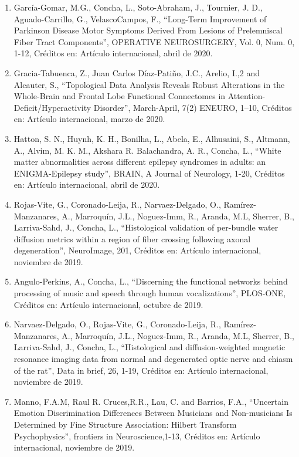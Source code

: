 \begin{enumerate}
\item García-Gomar, M.G., Concha, L., Soto-Abraham, J., Tournier, J. D., Aguado-Carrillo, G., VelascoCampos, F., “Long-Term 
Improvement of Parkinson Disease Motor Symptoms Derived From Lesions of Prelemniscal Fiber Tract Components”, OPERATIVE 
NEUROSURGERY, Vol. 0, Num. 0, 1-12, Créditos en: Artículo internacional, abril de 2020.

\item Gracia-Tabuenca, Z., Juan Carlos Díaz-Patiño, J.C., Arelio, I.,2 and Alcauter, S., “Topological Data Analysis Reveals 
Robust Alterations in the Whole-Brain and Frontal Lobe Functional Connectomes in Attention-Deficit/Hyperactivity Disorder”, 
March-April, 7(2) ENEURO, 1–10, Créditos en: Artículo internacional, marzo de 2020.

\item Hatton, S. N., Huynh, K. H., Bonilha, L., Abela, E., Alhusaini, S., Altmann, A., Alvim, M. K. M., Akshara R. 
Balachandra, A. R., Concha, L., “White matter abnormalities across different epilepsy syndromes in adults: an 
ENIGMA-Epilepsy study”, BRAIN, A Journal of Neurology, 1-20, Créditos en: Artículo internacional, abril de 2020.

\item Rojas-Vite, G., Coronado-Leija, R., Narvaez-Delgado, O., Ramírez-Manzanares, A., Marroquín, J.L., Noguez-Imm, R., 
Aranda, M.L, Sherrer, B., Larriva-Sahd, J., Concha, L., “Histological validation of per-bundle water diffusion metrics 
within a region of fiber crossing following axonal degeneration”, NeuroImage, 201, Créditos en: Artículo internacional, 
noviembre de 2019.

\item Angulo-Perkins, A., Concha, L., “Discerning the functional networks behind processing of music and speech through 
human 
vocalizations”, PLOS-ONE, Créditos en: Artículo internacional, octubre de 2019.

\item Narvaez-Delgado, O., Rojas-Vite, G., Coronado-Leija, R., Ramírez-Manzanares, A., Marroquín, J.L., Noguez-Imm, R., 
Aranda, M.L, Sherrer, B., Larriva-Sahd, J., Concha, L., “Histological and diffusion-weighted magnetic resonance imaging 
data from normal and degenerated optic nerve and chiasm of the rat”, Data in brief, 26, 1-19, Créditos en: Artículo 
internacional, noviembre de 2019.

\item Manno, F.A.M, Raul R. Cruces,R.R., Lau, C. and Barrios, F.A., “Uncertain Emotion Discrimination Differences Between 
Musicians and Non-musicians Is Determined by Fine Structure Association: Hilbert Transform Psychophysics”, frontiers in 
Neuroscience,1-13, Créditos en: Artículo internacional, noviembre de 2019.


\end{enumerate}
